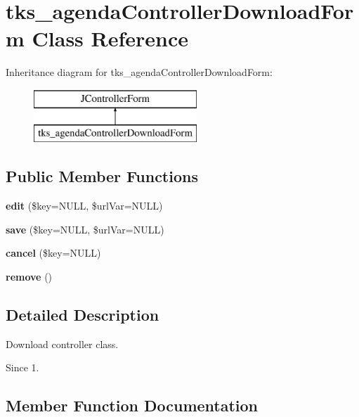 \section{tks\+\_\+agenda\+Controller\+Download\+Form Class Reference}
\label{classtks__agenda_controller_download_form}
Inheritance diagram for tks\+\_\+agenda\+Controller\+Download\+Form\+:\begin{figure}[H]
\begin{center}
\leavevmode
\includegraphics[height=2.000000cm]{classtks__agenda_controller_download_form}
\end{center}
\end{figure}
\subsection*{Public Member Functions}
\begin{DoxyCompactItemize}
\item 
\textbf{ edit} (\$key=N\+U\+LL, \$url\+Var=N\+U\+LL)
\item 
\textbf{ save} (\$key=N\+U\+LL, \$url\+Var=N\+U\+LL)
\item 
\textbf{ cancel} (\$key=N\+U\+LL)
\item 
\textbf{ remove} ()
\end{DoxyCompactItemize}


\subsection{Detailed Description}
Download controller class.

\begin{DoxySince}{Since}
1. 
\end{DoxySince}


\subsection{Member Function Documentation}
\mbox{\label{classtks__agenda_controller_download_form_aaa0353be19ab28c40ee7af29c7763266}} 
